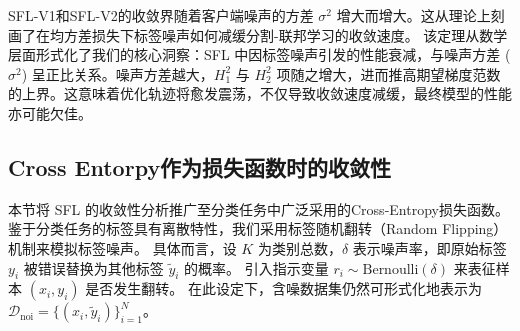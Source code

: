 
SFL-V1和SFL-V2的收敛界随着客户端噪声的方差 $\sigma^2$ 增大而增大。这从理论上刻画了在均方差损失下标签噪声如何减缓分割-联邦学习的收敛速度。
该定理从数学层面形式化了我们的核心洞察：SFL 中因标签噪声引发的性能衰减，与噪声方差 ($\sigma^2$) 呈正比关系。噪声方差越大，$H_1^2$ 与 $H_2^2$ 项随之增大，进而推高期望梯度范数的上界。这意味着优化轨迹将愈发震荡，不仅导致收敛速度减缓，最终模型的性能亦可能欠佳。
\subsection{Cross Entorpy作为损失函数时的收敛性}
本节将 SFL 的收敛性分析推广至分类任务中广泛采用的Cross-Entropy损失函数。
鉴于分类任务的标签具有离散特性，我们采用标签随机翻转（Random Flipping）机制来模拟标签噪声。
具体而言，设 $K$ 为类别总数，$\delta$ 表示噪声率，即原始标签 $y_i$ 被错误替换为其他标签 $\tilde{y}_i$ 的概率。
引入指示变量 $r_i \sim \text{Bernoulli}(\delta)$ 来表征样本 $(x_i, y_i)$ 是否发生翻转。
在此设定下，含噪数据集仍然可形式化地表示为 $\mathcal{D}_{\text{noi}} = \{(x_i, \tilde{y}_i)\}_{i=1}^N$。

